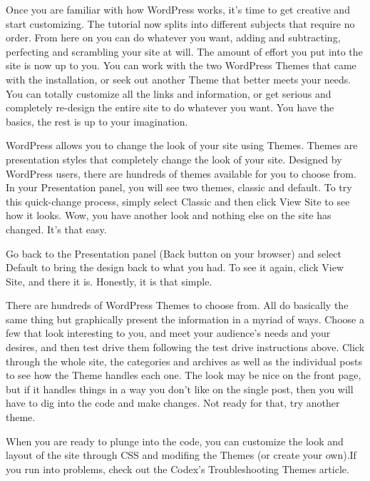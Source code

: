 Once you are familiar with how WordPress works, it's time to get creative and start customizing. The tutorial now splits into different subjects that require no order. From here on you can do whatever you want, adding and subtracting, perfecting and scrambling your site at will. The amount of effort you put into the site is now up to you. You can work with the two WordPress Themes that came with the installation, or seek out another Theme that better meets your needs. You can totally customize all the links and information, or get serious and completely re-design the entire site to do whatever you want. You have the basics, the rest is up to your imagination.

WordPress allows you to change the look of your site using Themes. Themes are presentation styles that completely change the look of your site. Designed by WordPress users, there are hundreds of themes available for you to choose from. In your Presentation panel, you will see two themes, classic and default. To try this quick-change process, simply select Classic and then click View Site to see how it looks. Wow, you have another look and nothing else on the site has changed. It's that easy.

Go back to the Presentation panel (Back button on your browser) and select Default to bring the design back to what you had. To see it again, click View Site, and there it is. Honestly, it is that simple.

There are hundreds of WordPress Themes to choose from. All do basically the same thing but graphically present the information in a myriad of ways. Choose a few that look interesting to you, and meet your audience's needs and your desires, and then test drive them following the test drive instructions above. Click through the whole site, the categories and archives as well as the individual posts to see how the Theme handles each one. The look may be nice on the front page, but if it handles things in a way you don't like on the single post, then you will have to dig into the code and make changes. Not ready for that, try another theme.

When you are ready to plunge into the code, you can customize the look and layout of the site through CSS and modifing the Themes (or create your own).If you run into problems, check out the Codex's Troubleshooting Themes article.

